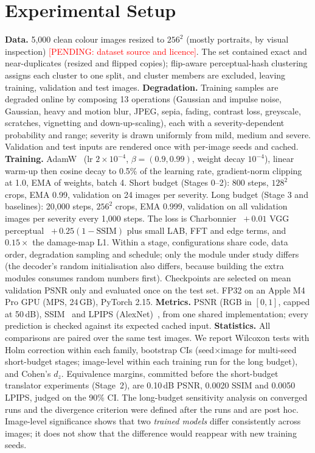 \documentclass[conference]{IEEEtran}
\newcommand{\pending}[1]{\textcolor{red}{[PENDING: #1]}}
\begin{document}
\section{Experimental Setup}\label{sec:setup}
\textbf{Data.} 5{,}000 clean colour images resized to $256^2$ (mostly portraits, by visual inspection)
\pending{dataset source and licence}. The set contained exact and near-duplicates (resized and flipped copies);
flip-aware perceptual-hash clustering assigns each cluster to one split, and \nExcluded{} cluster members are
excluded, leaving \nTrain{} training, \nVal{} validation and \nTest{} test images.
\textbf{Degradation.} Training samples are degraded online by composing 13 operations (Gaussian and impulse
noise, Gaussian, heavy and motion blur, JPEG, sepia, fading, contrast loss, greyscale, scratches, vignetting and
down-up-scaling), each with a severity-dependent probability and range; severity is drawn uniformly from mild,
medium and severe. Validation and test inputs are rendered once with per-image seeds and cached.
\textbf{Training.} AdamW~\cite{loshchilov2019adamw} (lr $2\times10^{-4}$, $\beta=(0.9,0.99)$, weight decay
$10^{-4}$), linear warm-up then cosine decay to 0.5\% of the learning rate, gradient-norm clipping at 1.0, EMA of
weights, batch 4. Short budget (Stages 0--2): 800 steps, $128^2$ crops, EMA 0.99, validation on 24 images per
severity. Long budget (Stage 3 and baselines): 20{,}000 steps, $256^2$ crops, EMA 0.999, validation on all
\nVal{} validation images per severity every 1{,}000 steps. The loss is Charbonnier~\cite{charbonnier1994}
$+\,0.01$ VGG perceptual~\cite{johnson2016perceptual} $+\,0.25(1-\mathrm{SSIM})$ plus small LAB, FFT and edge
terms, and $0.15\times$ the damage-map L1. Within a stage, configurations share code, data order, degradation
sampling and schedule; only the module under study differs (the decoder's random initialisation also differs,
because building the extra modules consumes random numbers first). Checkpoints are selected on mean validation PSNR only
and evaluated once on the test set. FP32 on an Apple M4 Pro GPU (MPS, 24\,GB), PyTorch 2.15.
\textbf{Metrics.} PSNR (RGB in $[0,1]$, capped at 50\,dB), SSIM~\cite{wang2004ssim} and LPIPS
(AlexNet)~\cite{zhang2018lpips}, from one shared implementation; every prediction is checked against its expected
cached input.
\textbf{Statistics.} All comparisons are paired over the same test images. We report Wilcoxon tests with Holm
correction within each family, bootstrap CIs (seed$\times$image for multi-seed short-budget stages; image-level
within each training run for the long budget), and Cohen's $d_z$. Equivalence margins, committed before the
short-budget translator experiments (Stage~2), are 0.10\,dB PSNR, 0.0020 SSIM and 0.0050 LPIPS, judged on the 90\% CI.
The long-budget sensitivity analysis on converged runs and the divergence criterion were defined after the
runs and are post hoc. Image-level significance shows that two \emph{trained models} differ consistently across images; it does not show
that the difference would reappear with new training seeds.
\end{document}
